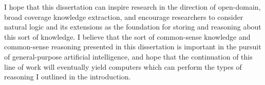 I hope that this dissertation can inspire research in the direction of open-domain, broad coverage
  knowledge extraction, and encourage researchers to consider natural logic and its extensions
  as the foundation for storing and reasoning about this sort of knowledge.
I believe that the sort of common-sense knowledge and common-sense reasoning presented in this dissertation
  is important in the pursuit of general-purpose artificial intelligence, and hope that the continuation
  of this line of work will eventually yield computers which can perform the types of reasoning I outlined in
  the introduction.

